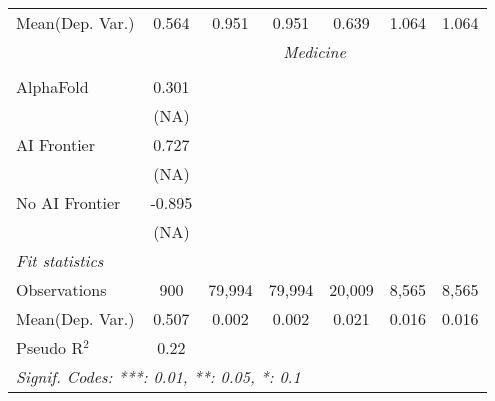 \begin{tabular}{lcccccc}
Mean(Dep. Var.) & 0.564 & 0.951 & 0.951 & 0.639 & 1.064 & 1.064 \\
 & \multicolumn{6}{c}{\textit{Medicine}} \\ \\
   AlphaFold      & 0.301      &        &        &        &       &   \\   
                  & (NA)       &        &        &        &       &   \\   
   AI Frontier    & 0.727      &        &        &        &       &   \\   
                  & (NA)       &        &        &        &       &   \\   
   No AI Frontier & -0.895     &        &        &        &       &   \\   
                  & (NA)       &        &        &        &       &   \\   
   \midrule
   \emph{Fit statistics}\\
   Observations   & 900        & 79,994 & 79,994 & 20,009 & 8,565 & 8,565\\  
Mean(Dep. Var.) & 0.507 & 0.002 & 0.002 & 0.021 & 0.016 & 0.016 \\
   Pseudo R$^2$   & 0.22       &        &        &        &       & \\  
   \midrule \midrule
   \multicolumn{7}{l}{\emph{Signif. Codes: ***: 0.01, **: 0.05, *: 0.1}}\\
\end{tabular}
\par\endgroup
